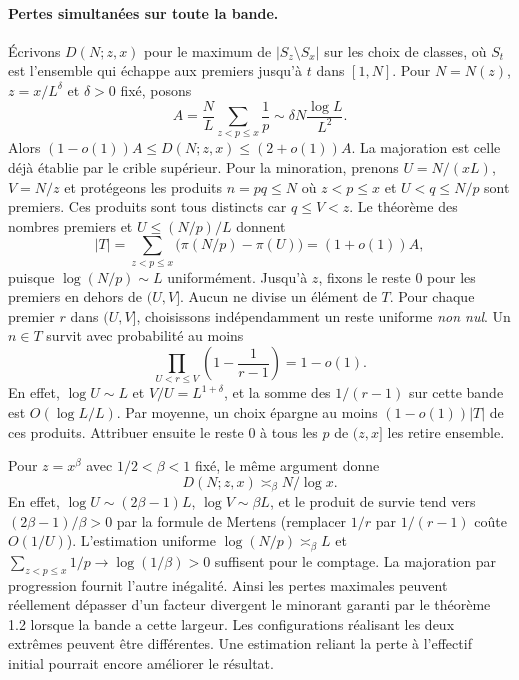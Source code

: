 \documentclass[11pt,a4paper]{article}
\begin{document}
\paragraph{Pertes simultanées sur toute la bande.}
Écrivons $D(N;z,x)$ pour le maximum de $|S_z\setminus S_x|$ sur les choix
de classes, où $S_t$ est l'ensemble qui échappe aux premiers jusqu'à $t$
dans $[1,N]$. Pour $N=N(z)$, $z=x/L^\delta$ et $\delta>0$ fixé, posons
\[
 A=\frac{N}{L}\sum_{z<p\le x}\frac1p
   \sim \delta N\frac{\log L}{L^2}.
\]
Alors $(1-o(1))A\le D(N;z,x)\le(2+o(1))A$. La majoration est celle
déjà établie par le crible supérieur. Pour la minoration, prenons
$U=N/(xL)$, $V=N/z$ et protégeons les produits $n=pq\le N$ où
$z<p\le x$ et $U<q\le N/p$ sont premiers. Ces produits sont tous
distincts car $q\le V<z$. Le théorème des nombres premiers et
$U\le(N/p)/L$ donnent
\[
 |T|=\sum_{z<p\le x}\bigl(\pi(N/p)-\pi(U)\bigr)=(1+o(1))A,
\]
puisque $\log(N/p)\sim L$ uniformément. Jusqu'à $z$, fixons le reste
$0$ pour les premiers en dehors de $(U,V]$. Aucun ne divise un
élément de $T$. Pour chaque premier $r$ dans $(U,V]$, choisissons
indépendamment un reste uniforme \emph{non nul}. Un $n\in T$ survit
avec probabilité au moins
\[
       \prod_{U<r\le V}\left(1-\frac1{r-1}\right)=1-o(1).
\]
En effet, $\log U\sim L$ et $V/U=L^{1+\delta}$, et la somme des
$1/(r-1)$ sur cette bande est $O(\log L/L)$. Par moyenne, un choix
épargne au moins $(1-o(1))|T|$ de ces produits. Attribuer ensuite
le reste $0$ à tous les $p$ de $(z,x]$ les retire ensemble.

Pour $z=x^\beta$ avec $1/2<\beta<1$ fixé, le même argument donne
\[
              D(N;z,x)\asymp_\beta N/\log x .
\]
En effet, $\log U\sim(2\beta-1)L$, $\log V\sim\beta L$, et le
produit de survie tend vers $(2\beta-1)/\beta>0$ par la formule de
Mertens (remplacer $1/r$ par $1/(r-1)$ coûte $O(1/U)$).
L'estimation uniforme $\log(N/p)\asymp_\beta L$ et
$\sum_{z<p\le x}1/p\to\log(1/\beta)>0$ suffisent pour le comptage.
La majoration par progression fournit l'autre inégalité. Ainsi les
pertes maximales peuvent réellement dépasser d'un facteur divergent le
minorant garanti par le théorème 1.2 lorsque la bande a cette largeur.
Les configurations réalisant les deux extrêmes peuvent être différentes.
Une estimation reliant la perte à l'effectif initial pourrait encore
améliorer le résultat.
\end{document}
